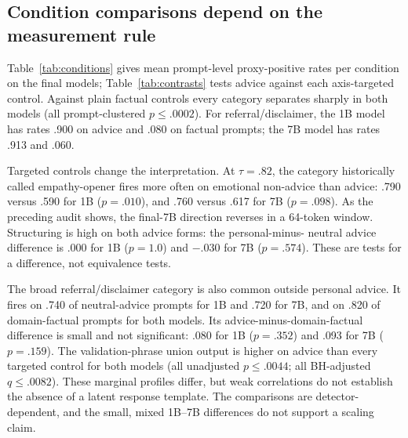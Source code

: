 \documentclass[11pt]{article}
\begin{document}
\subsection{Condition comparisons depend on the measurement rule}
\label{sec:decomposition}

Table~\ref{tab:conditions} gives mean prompt-level proxy-positive rates per condition on
the final models; Table~\ref{tab:contrasts} tests advice against each axis-targeted
control. Against plain factual controls every category separates sharply in both
models (all prompt-clustered $p\leq.0002$). For referral/disclaimer, the 1B
model has rates .900 on advice and .080 on factual prompts; the 7B model has
rates .913 and .060.

Targeted controls change the interpretation. At $\tau=.82$, the category
historically called empathy-opener fires more often on emotional non-advice than
advice: .790 versus .590 for 1B ($p=.010$), and .760 versus .617 for 7B
($p=.098$). As the preceding audit shows, the final-7B direction reverses in a
64-token window. Structuring is high on both advice forms: the personal-minus-
neutral advice difference is .000 for 1B ($p=1.0$) and $-.030$ for 7B
($p=.574$). These are tests for a difference, not equivalence tests.

The broad referral/disclaimer category is also common outside personal advice.
It fires on .740 of neutral-advice prompts for 1B and .720 for 7B, and on .820
of domain-factual prompts for both models. Its advice-minus-domain-factual
difference is small and not significant: .080 for 1B ($p=.352$) and .093 for
7B ($p=.159$). The validation-phrase union output is higher on advice than every
targeted control for both models (all unadjusted $p\leq.0044$; all BH-adjusted
$q\leq.0082$). These marginal profiles differ, but weak correlations do not
establish the absence of a latent response template. The comparisons are
detector-dependent, and the small, mixed 1B--7B differences do not support a
scaling claim.
\end{document}
